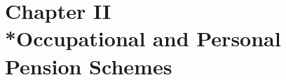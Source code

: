\documentclass[12pt,a4paper]{article}
\begin{document}
%
%
%
%
%
%
%
%
%
%


\section[Chapter II --- Occupational and Personal Pension Schemes]{Chapter II\\*Occupational and Personal Pension Schemes}
\renewcommand\parthead{--- Part II Chapter II}
\end{document}
